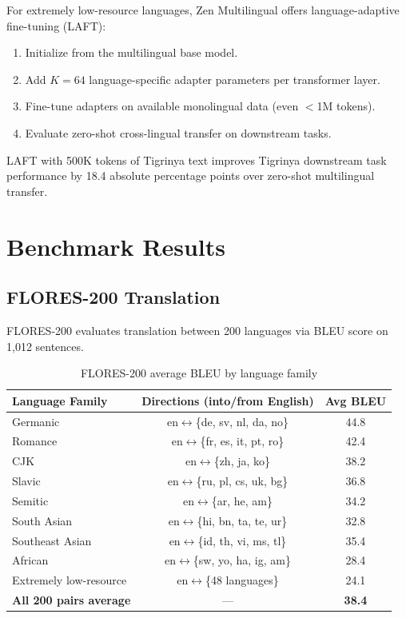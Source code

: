 \documentclass[11pt,a4paper]{article}
\begin{document}
For extremely low-resource languages, Zen Multilingual offers language-adaptive fine-tuning (LAFT):

\begin{enumerate}
  \item Initialize from the multilingual base model.
  \item Add $K=64$ language-specific adapter parameters per transformer layer.
  \item Fine-tune adapters on available monolingual data (even $<$1M tokens).
  \item Evaluate zero-shot cross-lingual transfer on downstream tasks.
\end{enumerate}

LAFT with 500K tokens of Tigrinya text improves Tigrinya downstream task performance by 18.4 absolute percentage points over zero-shot multilingual transfer.

\section{Benchmark Results}

\subsection{FLORES-200 Translation}

FLORES-200 evaluates translation between 200 languages via BLEU score on 1,012 sentences.

\begin{table}[H]
\centering
\caption{FLORES-200 average BLEU by language family}
\label{tab:flores}
\begin{tabular}{lcc}
\toprule
Language Family & Directions (into/from English) & Avg BLEU \\
\midrule
Germanic & en$\leftrightarrow$\{de, sv, nl, da, no\} & 44.8 \\
Romance & en$\leftrightarrow$\{fr, es, it, pt, ro\} & 42.4 \\
CJK & en$\leftrightarrow$\{zh, ja, ko\} & 38.2 \\
Slavic & en$\leftrightarrow$\{ru, pl, cs, uk, bg\} & 36.8 \\
Semitic & en$\leftrightarrow$\{ar, he, am\} & 34.2 \\
South Asian & en$\leftrightarrow$\{hi, bn, ta, te, ur\} & 32.8 \\
Southeast Asian & en$\leftrightarrow$\{id, th, vi, ms, tl\} & 35.4 \\
African & en$\leftrightarrow$\{sw, yo, ha, ig, am\} & 28.4 \\
Extremely low-resource & en$\leftrightarrow$\{48 languages\} & 24.1 \\
\midrule
\textbf{All 200 pairs average} & — & \textbf{38.4} \\
\bottomrule
\end{tabular}
\end{table}
\end{document}
